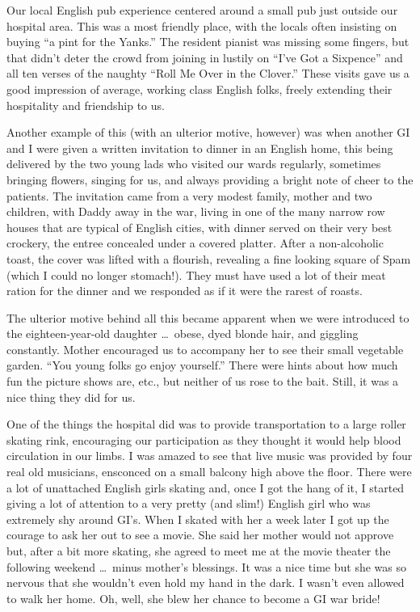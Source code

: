 \documentclass[../m3y]{subfiles}
\begin{document}
Our local English pub experience centered around a small pub just outside our hospital area. This was a most friendly place, with the locals often insisting on buying ``a pint for the Yanks.'' The resident pianist was missing some fingers, but that didn't deter the crowd from joining in lustily on ``I've Got a Sixpence'' and all ten verses of the naughty ``Roll Me Over in the Clover.'' These visits gave us a good impression of average, working class English folks, freely extending their hospitality and friendship to us.

Another example of this (with an ulterior motive, however) was when another GI and I were given a written invitation to dinner in an English home, this being delivered by the two young lads who visited our wards regularly, sometimes bringing flowers, singing for us, and always providing a bright note of cheer to the patients. The invitation came from a very modest family, mother and two children, with Daddy away in the war, living in one of the many narrow row houses that are typical of English cities, with dinner served on their very best crockery, the entree concealed under a covered platter. After a non-alcoholic toast, the cover was lifted with a flourish, revealing a fine looking square of Spam (which I could no longer stomach!). They must have used a lot of their meat ration for the dinner and we responded as if it were the rarest of roasts.

The ulterior motive behind all this became apparent when we were introduced to the eighteen-year-old daughter \ldots\ obese, dyed blonde hair, and giggling constantly. Mother encouraged us to accompany her to see their small vegetable garden. ``You young folks go enjoy yourself.'' There were hints about how much fun the picture shows are, etc.\@, but neither of us rose to the bait. Still, it was a nice thing they did for us.

One of the things the hospital did was to provide transportation to a large roller skating rink, encouraging our participation as they thought it would help blood circulation in our limbs. I was amazed to see that live music was provided by four real old musicians, ensconced on a small balcony high above the floor. There were a lot of unattached English girls skating and, once I got the hang of it, I started giving a lot of attention to a very pretty (and slim!) English girl who was extremely shy around GI's. When I skated with her a week later I got up the courage to ask her out to see a movie. She said her mother would not approve but, after a bit more skating, she agreed to meet me at the movie theater the following weekend \ldots\ minus mother's blessings. It was a nice time but she was so nervous that she wouldn't even hold my hand in the dark. I wasn't even allowed to walk her home. Oh, well, she blew her chance to become a GI war bride!
\end{document}
